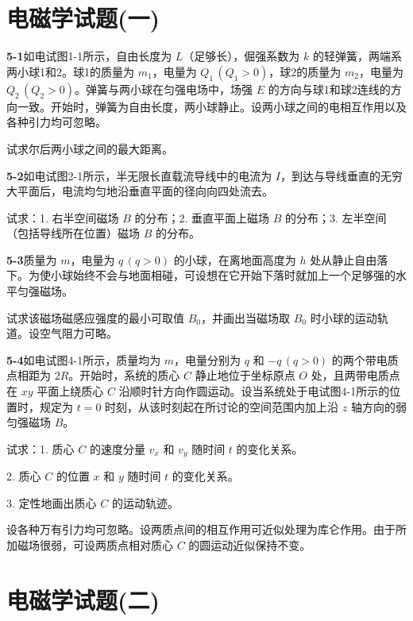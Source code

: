 \section*{电磁学试题(一)}
\vfill

\newpage
\textbf{5-1}\quad 如电试图1-1所示，自由长度为 $L$（足够长），倔强系数为 $k$ 的轻弹簧，两端系两小球1和2。球1的质量为 $m_{1}$，电量为 $Q_{1}\,(Q_{1} > 0)$，球2的质量为 $m_{2}$，电量为 $Q_{2}\,(Q_{2} > 0)$。弹簧与两小球在匀强电场中，场强 $E$ 的方向与球1和球2连线的方向一致。开始时，弹簧为自由长度，两小球静止。设两小球之间的电相互作用以及各种引力均可忽略。


试求尔后两小球之间的最大距离。
\vfill

\textbf{5-2}\quad 如电试图2-1所示，半无限长直载流导线中的电流为 $I$，到达与导线垂直的无穷大平面后，电流均匀地沿垂直平面的径向向四处流去。


试求：1. 右半空间磁场 $B$ 的分布；2. 垂直平面上磁场 $B$ 的分布；3. 左半空间（包括导线所在位置）磁场 $B$ 的分布。
\vfill

\newpage
\textbf{5-3}\quad 质量为 $m$，电量为 $q\,(q > 0)$ 的小球，在离地面高度为 $h$ 处从静止自由落下。为使小球始终不会与地面相碰，可设想在它开始下落时就加上一个足够强的水平匀强磁场。


试求该磁场磁感应强度的最小可取值 $B_{0}$，并画出当磁场取 $B_{0}$ 时小球的运动轨道。设空气阻力可略。
\vfill

\textbf{5-4}\quad 如电试图4-1所示，质量均为 $m$，电量分别为 $q$ 和 $-q\,(q > 0)$ 的两个带电质点相距为 $2R$。开始时，系统的质心 $C$ 静止地位于坐标原点 $O$ 处，且两带电质点在 $xy$ 平面上绕质心 $C$ 沿顺时针方向作圆运动。设当系统处于电试图4-1所示的位置时，规定为 $t = 0$ 时刻，从该时刻起在所讨论的空间范围内加上沿 $z$ 轴方向的弱匀强磁场 $B$。

试求：1. 质心 $C$ 的速度分量 $v_{x}$ 和 $v_{y}$ 随时间 $t$ 的变化关系。

2. 质心 $C$ 的位置 $x$ 和 $y$ 随时间 $t$ 的变化关系。

3. 定性地画出质心 $C$ 的运动轨迹。

设各种万有引力均可忽略。设两质点间的相互作用可近似处理为库仑作用。由于所加磁场很弱，可设两质点相对质心 $C$ 的圆运动近似保持不变。

\vfill


\section*{电磁学试题(二)}
\vfill

